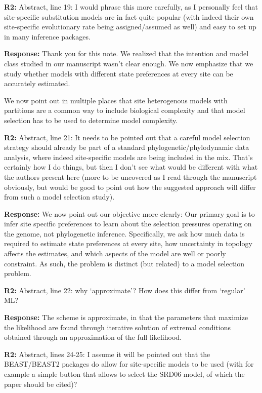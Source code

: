 \documentclass[aps,rmp,onecolumn]{revtex4-1}
\newcommand{\refb}[1]{\textbf{R2:} #1}
\newcommand{\response}[1]{{\color{black}\textbf{Response:} #1}}
\begin{document}
\refb{Abstract, line 19: I would phrase this more carefully, as I personally feel that site-specific substitution models are in fact quite popular (with indeed their own site-specific evolutionary rate being assigned/assumed as well) and easy to set up in many inference packages.}

\response{Thank you for this note. We realized that the intention and model class studied in our manuscript wasn't clear enough. We now emphasize that we study whether models with different state preferences at every site can be accurately estimated.

We now point out in multiple places that site heterogenous models with partitions are a common way to include biological complexity and that model selection has to be used to determine model complexity.
}

\refb{Abstract, line 21: It needs to be pointed out that a careful model selection strategy should already be part of a standard phylogenetic/phylodynamic data analysis, where indeed site-specific models are being included in the mix. That’s certainly how I do things, but then I don’t see what would be different with what the authors present here (more to be uncovered as I read through the manuscript obviously, but would be good to point out how the suggested approach will differ from such a model selection study).}

\response{
We now point out our objective more clearly: Our primary goal is to infer site specific preferences to learn about the selection pressures operating on the genome, not phylogenetic inference.
Specifically, we ask how much data is required to estimate state preferences at every site, how uncertainty in topology affects the estimates, and which aspects of the model are well or poorly constraint.
As such, the problem is distinct (but related) to a model selection problem.
}

\refb{Abstract, line 22: why ‘approximate’? How does this differ from ‘regular’ ML?}

\response{The scheme is approximate, in that the parameters that maximize the likelihood are found through iterative solution of extremal conditions obtained through an approximation of the full likelihood. }

\refb{Abstract, lines 24-25: I assume it will be pointed out that the BEAST/BEAST2 packages do allow for site-specific models to be used (with for example a simple button that allows to select the SRD06 model, of which the paper should be cited)?}
\end{document}
